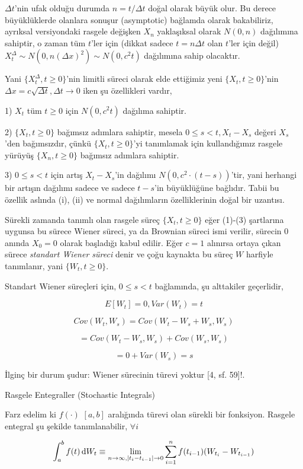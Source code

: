 \documentclass[12pt,fleqn]{article}\usepackage{../../common}
\begin{document}
$\Delta t$'nin ufak olduğu durumda $n = t/\Delta t$ doğal olarak büyük olur. Bu
derece büyüklüklerde olanlara sonuşur (asymptotic) bağlamda olarak bakabiliriz,
ayrıksal versiyondaki rasgele değişken $X_n$ yaklaşıksal olarak $N(0,n)$
dağılımına sahiptir, o zaman tüm $t$'ler için (dikkat sadece $t = n \Delta t$
olan $t$'ler için değil) $X_t^{\Delta} \sim N(0, n(\Delta x)^2) \sim N(0, c^2t)$
dağılımına sahip olacaktır.

Yani $\{ X_t^{\Delta}, t \ge 0 \}$'nin limitli süreci olarak elde ettiğimiz yeni
$\{ X_t, t \ge 0 \}$'nin $\Delta x = c \sqrt{\Delta t}, \Delta t \to 0$ iken şu
özellikleri vardır,

1) $X_t$ tüm $t \ge 0$ için $N(0,c^2t)$ dağılıma sahiptir. 

2) $\{ X_t, t \ge 0 \}$ bağımsız adımlara sahiptir, mesela $0 \le s < t,
X_t-X_s$ değeri $X_s$'den bağımsızdır, çünkü $\{ X_t, t \ge 0 \}$'yi tanımlamak
için kullandığımız rasgele yürüyüş $\{ X_n, t \ge 0 \}$ bağımsız adımlara
sahiptir.

3) $0 \le s < t$ için artış $X_t-X_s$'in dağılımı $N(0, c^2 \cdot (t-s))$'tir,
yani herhangi bir artışın dağılımı sadece ve sadece $t-s$'in büyüklüğüne
bağlıdır. Tabii bu özellik aslında (i), (ii) ve normal dağılımların
özelliklerinin doğal bir uzantısı.

Sürekli zamanda tanımlı olan rasgele süreç $\{ X_t, t \ge 0 \}$ eğer (1)-(3)
şartlarına uygunsa bu sürece Wiener süreci, ya da Brownian süreci ismi verilir,
sürecin 0 anında $X_0=0$ olarak başladığı kabul edilir. Eğer $c=1$ alınırsa
ortaya çıkan sürece {\em standart Wiener süreci} denir ve çoğu kaynakta bu süreç
$W$ harfiyle tanımlanır, yani $\{ W_t, t \ge 0 \}$.

Standart Wiener süreçleri için, $0 \le s < t$ bağlamında, şu alttakiler
geçerlidir,

$$ E[W_t] = 0, Var(W_t) = t $$

$$ Cov(W_t,W_s) = Cov(W_t-W_s+W_s, W_s) $$

$$ = Cov(W_t-W_s,W_s) + Cov(W_s,W_s) $$

$$ = 0 + Var(W_s) = s $$

İlginç bir durum şudur: Wiener sürecinin türevi yoktur [4, sf. 59]!.

Rasgele Entegraller (Stochastic Integrals)

Farz edelim ki $f(\cdot)$ $[a,b]$ aralığında türevi olan sürekli bir
fonksiyon. Rasgele entegral şu şekilde tanımlanabilir, $\forall i$

$$
\int_{ a}^{b} f(t) \,\mathrm{d} W_t \equiv  
\lim_{ n \to \infty, |t_i-t_{i-1}| \to 0 }
\sum _{i=1}^{n} f(t_{i-1}) ( W_{t_i} - W_{t_{i-1}})
$$
\end{document}
